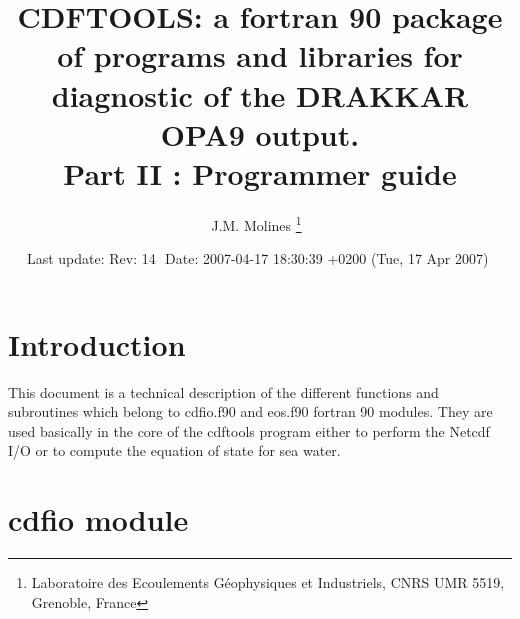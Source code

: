 \documentclass[a4paper,11pt]{article}
\begin{document}
\newcommand{\etal}{{\it et al.}}
\newcommand{\DegN}{$^{\circ}$N}
\newcommand{\DegW}{$^{\circ}$W}
\newcommand{\DegE}{$^{\circ}$E}
\newcommand{\DegS}{$^{\circ}$S}
\newcommand{\Deg}{$^{\circ}$}
\newcommand{\DegC}{$^{\circ}$C}
\newcommand{\DS}{ \renewcommand{\baselinestretch}{1.8} \tiny \normalsize}
\newcommand{\ST}{ \renewcommand{\baselinestretch}{1.2} \tiny \normalsize}
\newcommand{\ao}{add\_offset}
\newcommand{\SF}{scale\_factor}

\title{CDFTOOLS: a fortran 90 package of programs and libraries for diagnostic 
of the DRAKKAR OPA9 output.\\
Part II : Programmer guide}

\author{J.M. Molines  \thanks{Laboratoire des Ecoulements G\'eophysiques et Industriels, CNRS UMR 5519, Grenoble, France}\ }


\date{Last update: $ $Rev: 14 $ $  $ $Date: 2007-04-17 18:30:39 +0200 (Tue, 17 Apr 2007) $ $ }

\maketitle
\section*{Introduction}
This document is a technical description of the different functions and subroutines which belong to cdfio.f90 and eos.f90 fortran 90 modules.
They are used basically in the core of the cdftools program either to perform the Netcdf I/O or to compute the equation of state for sea water.

\section{ cdfio module}
\end{document}
